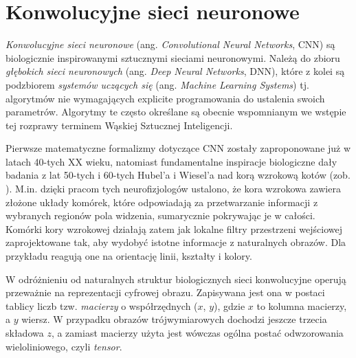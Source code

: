 \chapter{Konwolucyjne sieci neuronowe}
\label{CNNs}
\textit{Konwolucyjne sieci neuronowe} (ang. \textit{Convolutional Neural Networks}, CNN) \linebreak są biologicznie inspirowanymi sztucznymi sieciami neuronowymi. Należą do zbioru \textit{głębokich sieci neuronowych} (ang. \textit{Deep Neural Networks}, DNN), które z kolei są podzbiorem \textit{systemów uczących się} (ang. \textit{Machine Learning Systems}) tj. algorytmów nie wymagających explicite programowania do ustalenia swoich parametrów. Algorytmy te często określane są obecnie wspomnianym we wstępie tej rozprawy terminem Wąskiej Sztucznej Inteligencji.

Pierwsze matematyczne formalizmy dotyczące CNN zostały zaproponowane już w latach 40-tych XX wieku, natomiast fundamentalne inspiracje biologiczne dały badania z lat 50-tych i 60-tych Hubel'a i Wiesel’a nad korą wzrokową kotów (zob. \cite{Wurtz2009}). M.in. dzięki pracom tych neurofizjologów ustalono, że kora wzrokowa zawiera złożone układy komórek, które odpowiadają za przetwarzanie informacji \linebreak z wybranych regionów pola widzenia, sumarycznie pokrywając je w całości. Komórki kory wzrokowej działają zatem jak lokalne filtry przestrzeni wejściowej zaprojektowane tak, aby wydobyć istotne informacje z naturalnych obrazów. Dla przykładu reagują one na orientację linii, kształty i kolory.

W odróżnieniu od naturalnych struktur biologicznych sieci konwolucyjne operują przeważnie na reprezentacji cyfrowej obrazu. Zapisywana jest ona w postaci tablicy liczb tzw. \textit{macierzy} o współrzędnych ($x$, $y$), gdzie $x$ to kolumna macierzy, a \linebreak $y$ wiersz. W przypadku obrazów trójwymiarowych dochodzi jeszcze trzecia składowa $z$, a zamiast macierzy użyta jest wówczas ogólna postać odwzorowania wieloliniowego, czyli \textit{tensor}.

